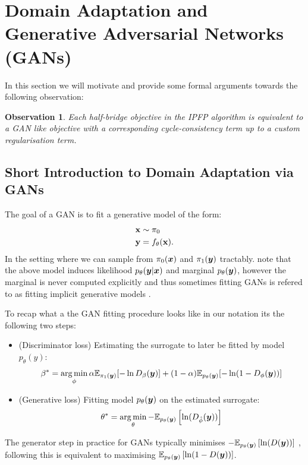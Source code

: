 \documentclass[a4paper,12pt,twoside,openright]{report}
\newtheorem{observation}[theorem]{Observation}
\theoremstyle{definition}
\begin{document}
\section{Domain Adaptation and Generative Adversarial Networks (GANs)}

In this section we will motivate and provide some formal arguments towards the following observation:
\begin{observation}
Each half-bridge objective in the IPFP algorithm is equivalent to a GAN like objective with a corresponding cycle-consistency term up to a custom regularisation term.
\end{observation}

\subsection{Short Introduction to Domain Adaptation via GANs}

The goal of a GAN is to fit a generative model of the form:
\begin{align*}
    {\mathbf{x}} &\sim \pi_0 \\
    {\mathbf{y}} &= f_{\theta}({\mathbf{x}}).
\end{align*}
In the setting where we can sample from $\pi_0({\bm{x}})$ and $\pi_1({\bm{y}})$ tractably. note that the above model induces likelihood $p_{\theta}({\bm{y}} | {\bm{x}})$ and marginal $p_{\theta}({\bm{y}})$, however the marginal is never computed explicitly and thus sometimes fitting GANs is refered to as fitting implicit generative models \citep{mohamed2016learning}.

To recap what a the GAN fitting procedure \citep{goodfellow2014generative} looks like in our notation its the following two steps:

\begin{itemize}
    \item (Discriminator loss) Estimating the surrogate to later be fitted by model $p_{\theta}(y)$:
 $$ {\beta}^{*} = \operatorname*{arg\,min}_{\phi} \alpha \mathbb{E}_{\pi_1({\bm{y}})}[-\operatorname{ln} D_{\beta}({\bm{y}})] + (1-\alpha)\mathbb{E}_{p_{\theta}({\bm{y}})}[-\operatorname{ln} (1-D_{\phi}({\bm{y}}))]$$ 
 \item (Generative loss) Fitting model $p_{\theta}({\bm{y}})$ on the estimated surrogate:
 $$\theta^{*} = \operatorname*{arg\,min}_{\theta}-\mathbb{E}_{p_{\theta}({\bm{y}})}\left[\operatorname{ln}(D_{\hat{\phi}}({\bm{y}}))\right] $$ 
\end{itemize}

The generator step in practice for GANs \citep{goodfellow2014generative} typically minimises $-\mathbb{E}_{p_{\theta}({\bm{y}})}\left[\operatorname{ln}(D({\bm{y}}))\right]$  , following \cite{goodfellow2014generative} this is equivalent to maximising  $\mathbb{E}_{p_{\theta}({\bm{y}})}\left[\operatorname{ln}(1-D({\bm{y}}))\right]$.
\end{document}
